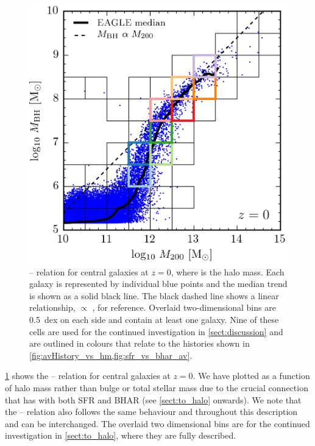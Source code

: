 \begin{figure}
\includegraphics[width=\columnwidth]{plots/BHMvsHM}

\caption{-- relation for central galaxies at $z=0$, where 
is the halo mass. Each galaxy is represented by individual blue points and the
median trend is shown as a solid black line. The black dashed line shows a
linear relationship,  $\propto$ , for reference.  Overlaid
two-dimensional bins are 0.5~dex on each side and contain at least one galaxy.
Nine of these cells are used for the continued investigation in
\cref{sect:discussion} and are outlined in colours that relate to the histories
shown in \cref{fig:avHistory_vs_hm,fig:sfr_vs_bhar_av}.}

\label{fig:bhm_vs_hm}
\end{figure}

\cref{fig:bhm_vs_hm} shows the -- relation for central galaxies at
$z=0$.  We have plotted  as a function of halo mass rather than bulge or
total stellar mass due to the crucial connection that  has with both SFR
and BHAR (see \cref{sect:to_halo} onwards). We note that the --\M{*}
relation also follows the same behaviour \citep[see Figure 1 of][]{Barber2016}
and throughout this description  and \M{*} can be interchanged. The
overlaid two dimensional bins are for the continued investigation in
\cref{sect:to_halo}, where they are fully described.  

